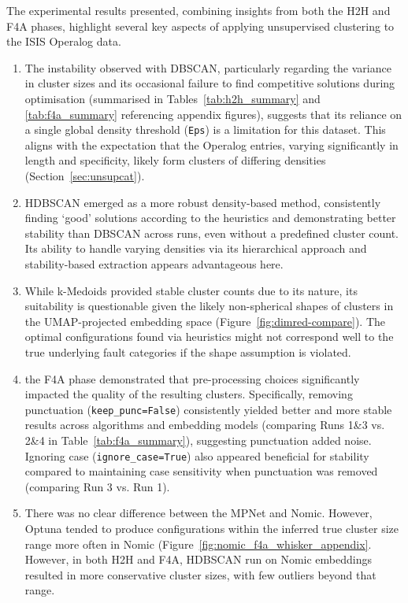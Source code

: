 \documentclass[10pt,oneside]{report}
\begin{document}
The experimental results presented, combining insights from both the H2H and F4A phases, highlight several key aspects of applying unsupervised clustering to the ISIS Operalog data.


\begin{enumerate}
    \item The instability observed with DBSCAN, particularly regarding the variance in cluster sizes and its occasional failure to find competitive solutions during optimisation (summarised in Tables~\ref{tab:h2h_summary} and \ref{tab:f4a_summary} referencing appendix figures), suggests that its reliance on a single global density threshold (\texttt{Eps}) is a limitation for this dataset. This aligns with the expectation that the Operalog entries, varying significantly in length and specificity, likely form clusters of differing densities (Section~\ref{sec:unsupcat}).

    \item HDBSCAN emerged as a more robust density-based method, consistently finding `good' solutions according to the heuristics and demonstrating better stability than DBSCAN across runs, even without a predefined cluster count. Its ability to handle varying densities via its hierarchical approach and stability-based extraction \cite{campello2013density} appears advantageous here.

    \item While k-Medoids provided stable cluster counts due to its nature, its suitability is questionable given the likely non-spherical shapes of clusters in the UMAP-projected embedding space (Figure~\ref{fig:dimred-compare}). The optimal configurations found via heuristics might not correspond well to the true underlying fault categories if the shape assumption is violated.

    \item the F4A phase demonstrated that pre-processing choices significantly impacted the quality of the resulting clusters. Specifically, removing punctuation (\texttt{keep\_punc=False}) consistently yielded better and more stable results across algorithms and embedding models (comparing Runs 1\&3 vs. 2\&4 in Table~\ref{tab:f4a_summary}), suggesting punctuation added noise. Ignoring case (\texttt{ignore\_case=True}) also appeared beneficial for stability compared to maintaining case sensitivity when punctuation was removed (comparing Run 3 vs. Run 1).

    \item There was no clear difference between the MPNet and Nomic. However, Optuna tended to produce configurations within the inferred true cluster size range more often in Nomic (Figure~\ref{fig:nomic_f4a_whisker_appendix}. However, in both H2H and F4A, HDBSCAN run on Nomic embeddings resulted in more conservative cluster sizes, with few outliers beyond that range.


\end{enumerate}
\end{document}
